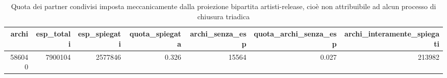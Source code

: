\begin{table}
\centering
\caption{Quota dei partner condivisi imposta meccanicamente dalla proiezione bipartita artisti-release, cioè non attribuibile ad alcun processo di chiusura triadica}
\label{tab:t4_proiezione}
\begin{tabular}{rrrrrrr}
\toprule
 archi &  esp\_totali &  esp\_spiegati &  quota\_spiegata &  archi\_senza\_esp &  quota\_archi\_senza\_esp &  archi\_interamente\_spiegati \\
\midrule
586040 &     7900104 &       2577846 &           0.326 &            15564 &                  0.027 &                      213982 \\
\bottomrule
\end{tabular}
\end{table}
